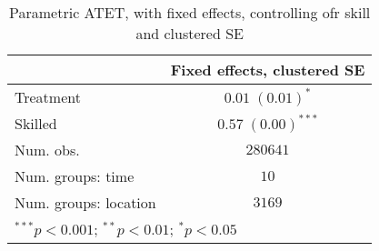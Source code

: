 
\begin{table}
\caption{Parametric ATET, with fixed effects, controlling ofr skill and clustered SE}
\begin{center}
\begin{tabular}{l c}
\hline
 & Fixed effects, clustered SE \\
\hline
Treatment             & $0.01 \; (0.01)^{*}$   \\
Skilled               & $0.57 \; (0.00)^{***}$ \\
\hline
Num. obs.             & $280641$               \\
Num. groups: time     & $10$                   \\
Num. groups: location & $3169$                 \\
\hline
\multicolumn{2}{l}{\scriptsize{$^{***}p<0.001$; $^{**}p<0.01$; $^{*}p<0.05$}}
\end{tabular}
\label{table:coefficients}
\end{center}
\end{table}
